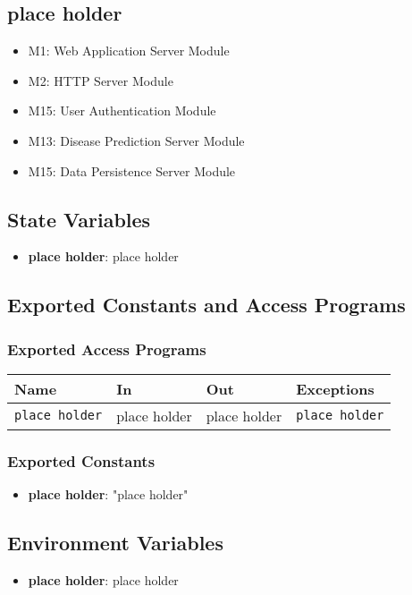 \documentclass[12pt, titlepage]{article}
\begin{document}
\subsection{place holder}
\begin{itemize}
\item M1: Web Application Server Module
\item M2: HTTP Server Module
\item M15: User Authentication Module
\item M13: Disease Prediction Server Module 
\item M15: Data Persistence Server Module
\end{itemize}

\subsection{State Variables}
\begin{itemize}
\item \textbf{place holder}: place holder
\end{itemize}

\subsection{Exported Constants and Access Programs}
\subsubsection{Exported Access Programs}
\begin{tabular}{|l|l|l|l|}
    \hline
    \textbf{Name} & \textbf{In} & \textbf{Out} & \textbf{Exceptions} \\
    \hline 
    \texttt{place holder} & place holder & place holder & \texttt{place holder} \\
    \hline
\end{tabular}

\subsubsection{Exported Constants}
\begin{itemize}
\item \textbf{place holder}: "place holder" 
\end{itemize}

\subsection{Environment Variables}
\begin{itemize}
\item \textbf{place holder}: place holder
\end{itemize}
\end{document}
